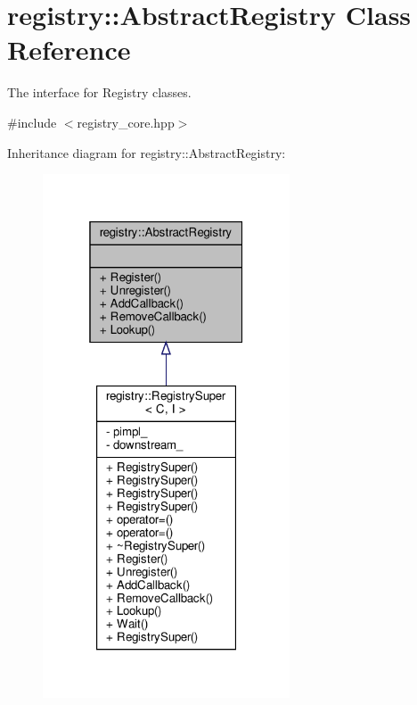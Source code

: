 \hypertarget{classregistry_1_1AbstractRegistry}{}\section{registry\+:\+:Abstract\+Registry Class Reference}
\label{classregistry_1_1AbstractRegistry}


The interface for Registry classes.  




{\ttfamily \#include $<$registry\+\_\+core.\+hpp$>$}



Inheritance diagram for registry\+:\+:Abstract\+Registry\+:
\nopagebreak
\begin{figure}[H]
\begin{center}
\leavevmode
\includegraphics[width=208pt]{classregistry_1_1AbstractRegistry__inherit__graph}
\end{center}
\end{figure}


